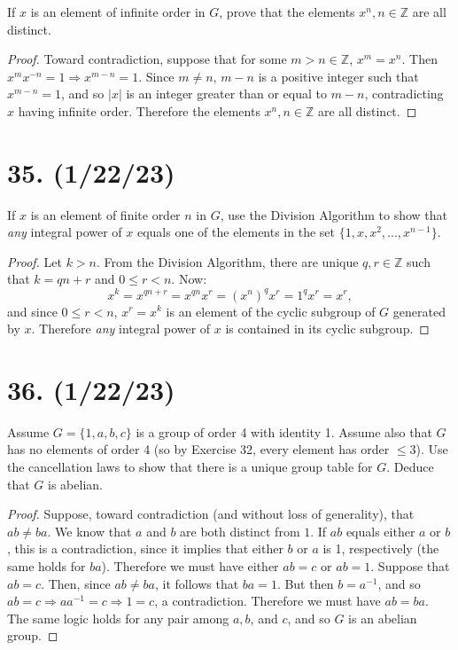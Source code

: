 \documentclass{article}
\begin{document}
If $x$ is an element of infinite order in $G$, prove that the elements $x^n, n \in \mathbb{Z}$ are all distinct.

\begin{proof}
      Toward contradiction, suppose that for some $m > n \in \mathbb{Z}$, $x^m = x^n$. Then $x^m x^{-n} = 1 \Rightarrow x^{m - n} = 1$. Since $m \neq n$, $m - n$ is a positive integer such that $x^{m - n} = 1$, and so $|x|$ is an integer greater than or equal to $m - n$, contradicting $x$ having infinite order. Therefore the elements $x^n, n \in \mathbb{Z}$ are all distinct.
\end{proof}

\section*{35. (1/22/23)}

If $x$ is an element of finite order $n$ in $G$, use the Division Algorithm to show that \emph{any} integral power of $x$ equals one of the elements in the set $\{1, x, x^2, ..., x^{n - 1} \}$.

\begin{proof}
      Let $k > n$. From the Division Algorithm, there are unique $q, r \in \mathbb{Z}$ such that $k = qn + r$ and $0 \leq r < n$. Now:
      \begin{equation*}
            x^k = x^{qn + r} = x^{qn} x^r = (x^n)^q x^r = 1^q x^r = x^r,
      \end{equation*}
      and since $0 \leq r < n$, $x^r = x^k$ is an element of the cyclic subgroup of $G$ generated by $x$. Therefore \emph{any} integral power of $x$ is contained in its cyclic subgroup.
\end{proof}

\section*{36. (1/22/23)}

Assume $G = \{1, a, b, c\}$ is a group of order 4 with identity 1. Assume also that $G$ has no elements of order 4 (so by Exercise 32, every element has order $\leq 3$). Use the cancellation laws to show that there is a unique group table for $G$. Deduce that $G$ is abelian.

\begin{proof}
      Suppose, toward contradiction (and without loss of generality), that $ab \neq ba$. We know that $a$ and $b$ are both distinct from $1$. If $ab$ equals either $a$ or $b$, this is a contradiction, since it implies that either $b$ or $a$ is 1, respectively (the same holds for $ba$). Therefore we must have either $ab = c$ or $ab = 1$. Suppose that $ab = c$. Then, since $ab \neq ba$, it follows that $ba = 1$. But then $b = a^{-1}$, and so $ab = c \Rightarrow a a^{-1}  = c \Rightarrow 1 = c$, a contradiction. Therefore we must have $ab = ba$. The same logic holds for any pair among $a, b$, and $c$, and so $G$ is an abelian group.
\end{proof}
\end{document}

